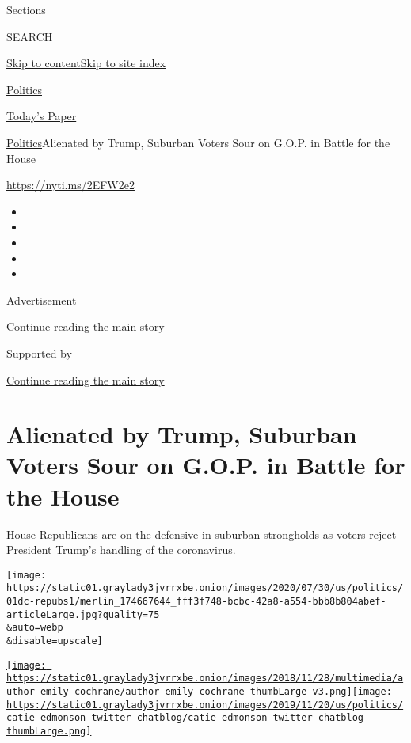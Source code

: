 Sections

SEARCH

\protect\hyperlink{site-content}{Skip to
content}\protect\hyperlink{site-index}{Skip to site index}

\href{https://www.nytimes3xbfgragh.onion/section/politics}{Politics}

\href{https://myaccount.nytimes3xbfgragh.onion/auth/login?response_type=cookie\&client_id=vi}{}

\href{https://www.nytimes3xbfgragh.onion/section/todayspaper}{Today's
Paper}

\href{/section/politics}{Politics}\textbar{}Alienated by Trump, Suburban
Voters Sour on G.O.P. in Battle for the House

\url{https://nyti.ms/2EFW2e2}

\begin{itemize}
\item
\item
\item
\item
\item
\end{itemize}

Advertisement

\protect\hyperlink{after-top}{Continue reading the main story}

Supported by

\protect\hyperlink{after-sponsor}{Continue reading the main story}

\hypertarget{alienated-by-trump-suburban-voters-sour-on-gop-in-battle-for-the-house}{%
\section{Alienated by Trump, Suburban Voters Sour on G.O.P. in Battle
for the
House}\label{alienated-by-trump-suburban-voters-sour-on-gop-in-battle-for-the-house}}

House Republicans are on the defensive in suburban strongholds as voters
reject President Trump's handling of the coronavirus.

\texttt{[image: https://static01.graylady3jvrrxbe.onion/images/2020/07/30/us/politics/01dc-repubs1/merlin\_174667644\_fff3f748-bcbc-42a8-a554-bbb8b804abef-articleLarge.jpg?quality=75\\\&auto=webp\\\&disable=upscale]}

\href{https://www.nytimes3xbfgragh.onion/by/emily-cochrane}{\texttt{[image: https://static01.graylady3jvrrxbe.onion/images/2018/11/28/multimedia/author-emily-cochrane/author-emily-cochrane-thumbLarge-v3.png]}}\href{https://www.nytimes3xbfgragh.onion/by/catie-edmondson}{\texttt{[image: https://static01.graylady3jvrrxbe.onion/images/2019/11/20/us/politics/catie-edmonson-twitter-chatblog/catie-edmonson-twitter-chatblog-thumbLarge.png]}}

